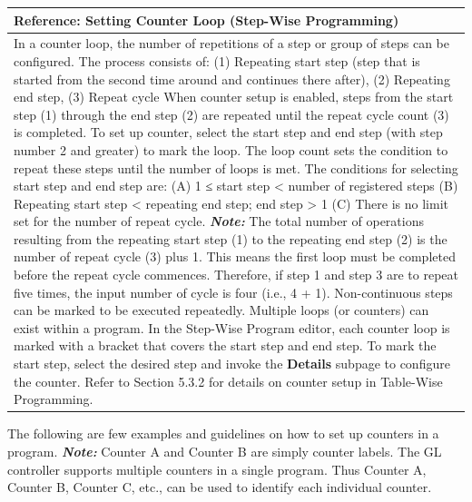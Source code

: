 \begin{longtable}[]{@{}l@{}}
\toprule
\begin{minipage}[b]{0.97\columnwidth}\raggedright
\textbf{Reference}: Setting Counter Loop (Step-Wise Programming)\strut
\end{minipage}\tabularnewline
\midrule
\endhead
\begin{minipage}[t]{0.97\columnwidth}\raggedright
In a counter loop, the number of repetitions of a step or group of steps
can be configured. The process consists of: (1) Repeating start step
(step that is started from the second time around and continues there
after), (2) Repeating end step, (3) Repeat cycle When counter setup is
enabled, steps from the start step (1) through the end step (2) are
repeated until the repeat cycle count (3) is completed. To set up
counter, select the start step and end step (with step number 2 and
greater) to mark the loop. The loop count sets the condition to repeat
these steps until the number of loops is met. The conditions for
selecting start step and end step are: (A) 1 ≤ start step \textless{}
number of registered steps (B) Repeating start step \textless{}
repeating end step; end step \textgreater{} 1 (C) There is no limit set
for the number of repeat cycle. \textbf{\emph{Note:}} The total number
of operations resulting from the repeating start step (1) to the
repeating end step (2) is the number of repeat cycle (3) plus 1. This
means the first loop must be completed before the repeat cycle
commences. Therefore, if step 1 and step 3 are to repeat five times, the
input number of cycle is four (i.e., 4 + 1). Non-continuous steps can be
marked to be executed repeatedly. Multiple loops (or counters) can exist
within a program. In the Step-Wise Program editor, each counter loop is
marked with a bracket that covers the start step and end step. To mark
the start step, select the desired step and invoke the \textbf{Details}
subpage to configure the counter. Refer to Section 5.3.2 for details on
counter setup in Table-Wise Programming.\strut
\end{minipage}\tabularnewline
\bottomrule
\end{longtable}

The following are few examples and guidelines on how to set up counters
in a program. \textbf{\emph{Note:}} Counter A and Counter B are simply
counter labels. The GL controller supports multiple counters in a single
program. Thus Counter A, Counter B, Counter C, etc., can be used to
identify each individual counter.

